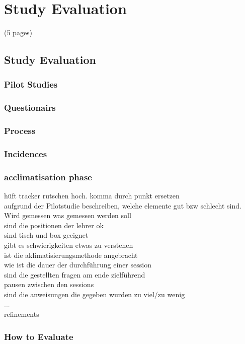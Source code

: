 \chapter{Study Evaluation}
\label{chapter:study_evaluation}
(5 pages)
\section{Study Evaluation}
\subsection{Pilot Studies}
\subsection{Questionairs}
\subsection{Process}
\subsection{Incidences}
\subsection{acclimatisation phase}
hüft tracker rutschen hoch.
komma durch punkt ersetzen\\
aufgrund der Pilotstudie beschreiben, welche elemente gut bzw schlecht sind.\\
Wird gemessen was gemessen werden soll\\
sind die positionen der lehrer ok\\
sind tisch und box geeignet\\
gibt es schwierigkeiten etwas zu verstehen\\
ist die aklimatisierungsmethode angebracht\\
wie ist die dauer der durchführung einer session\\
sind die gestellten fragen am ende zielführend\\
pausen zwischen den sessions\\
sind die anweisungen die gegeben wurden zu viel/zu wenig\\
...\\
refinements\\
\subsection{How to Evaluate}